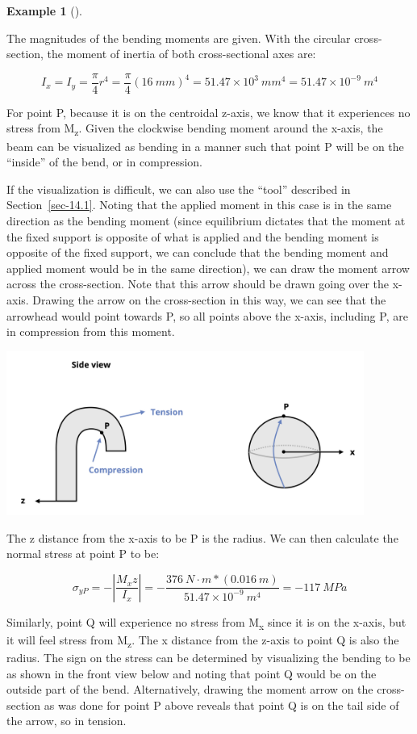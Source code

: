 \documentclass[
  letterpaper,
  DIV=11,
  numbers=noendperiod]{scrreprt}
\theoremstyle{definition}
\newtheorem{example}{Example}[chapter]
\theoremstyle{remark}
\begin{document}
\begin{tcolorbox}
\begin{example}[]
\begin{tcolorbox}
The magnitudes of the bending moments are given. With the circular
cross-section, the moment of inertia of both cross-sectional axes are:

\[
I_x=I_y=\frac{\pi}{4} r^4=\frac{\pi}{4}(16{~mm})^4=51.47 \times 10^3{~mm}^4=51.47 \times 10^{-9}{~m}^4
\]

For point P, because it is on the centroidal z-axis, we know that it
experiences no stress from M\textsubscript{z}. Given the clockwise
bending moment around the x-axis, the beam can be visualized as bending
in a manner such that point P will be on the ``inside'' of the bend, or
in compression.

If the visualization is difficult, we can also use the ``tool''
described in Section~\ref{sec-14.1}. Noting that the applied moment in
this case is in the same direction as the bending moment (since
equilibrium dictates that the moment at the fixed support is opposite of
what is applied and the bending moment is opposite of the fixed support,
we can conclude that the bending moment and applied moment would be in
the same direction), we can draw the moment arrow across the
cross-section. Note that this arrow should be drawn going over the
x-axis. Drawing the arrow on the cross-section in this way, we can see
that the arrowhead would point towards P, so all points above the
x-axis, including P, are in compression from this moment.

\begin{center}
\includegraphics[width=4.61458in,height=\textheight]{images/CH14 PNGs/example 14.1 part 2.png}
\end{center}

The z distance from the x-axis to be P is the radius. We can then
calculate the normal stress at point P to be:

\[
\sigma_{yP}=-\left|\frac{M_x z}{I_x}\right|=-\frac{376{~N}\cdot{m}*(0.016{~m})}{51.47 \times 10^{-9}{~m}^4}=-117{~MPa}
\]

Similarly, point Q will experience no stress from M\textsubscript{x}
since it is on the x-axis, but it will feel stress from
M\textsubscript{z}. The x distance from the z-axis to point Q is also
the radius. The sign on the stress can be determined by visualizing the
bending to be as shown in the front view below and noting that point Q
would be on the outside part of the bend. Alternatively, drawing the
moment arrow on the cross-section as was done for point P above reveals
that point Q is on the tail side of the arrow, so in tension.


\end{tcolorbox}
\end{example}
\end{tcolorbox}
\end{document}
